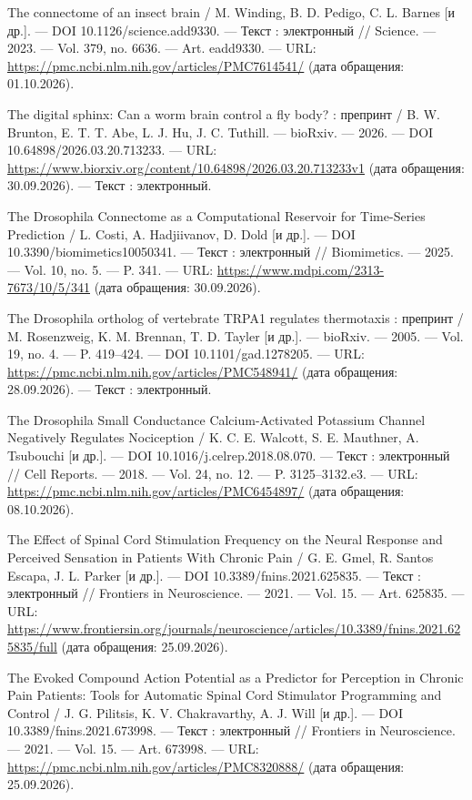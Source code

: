 \begin{list}{}{\setlength{\leftmargin}{10mm}\setlength{\labelwidth}{8mm}\setlength{\labelsep}{2mm}\setlength{\itemsep}{0pt}\setlength{\parsep}{0pt}\setlength{\topsep}{0pt}}
\item[268.] The connectome of an insect brain / M. Winding, B. D. Pedigo, C. L. Barnes [и др.]. — DOI 10.1126/science.add9330. — Текст : электронный // Science. — 2023. — Vol. 379, no. 6636. — Art. eadd9330. — URL: \url{https://pmc.ncbi.nlm.nih.gov/articles/PMC7614541/} (дата обращения: 01.10.2026).
\item[269.] The digital sphinx: Can a worm brain control a fly body? : препринт / B. W. Brunton, E. T. T. Abe, L. J. Hu, J. C. Tuthill. — bioRxiv. — 2026. — DOI 10.64898/2026.03.20.713233. — URL: \url{https://www.biorxiv.org/content/10.64898/2026.03.20.713233v1} (дата обращения: 30.09.2026). — Текст : электронный.
\item[270.] The Drosophila Connectome as a Computational Reservoir for Time-Series Prediction / L. Costi, A. Hadjiivanov, D. Dold [и др.]. — DOI 10.3390/biomimetics10050341. — Текст : электронный // Biomimetics. — 2025. — Vol. 10, no. 5. — P. 341. — URL: \url{https://www.mdpi.com/2313-7673/10/5/341} (дата обращения: 30.09.2026).
\item[271.] The Drosophila ortholog of vertebrate TRPA1 regulates thermotaxis : препринт / M. Rosenzweig, K. M. Brennan, T. D. Tayler [и др.]. — bioRxiv. — 2005. — Vol. 19, no. 4. — P. 419–424. — DOI 10.1101/gad.1278205. — URL: \url{https://pmc.ncbi.nlm.nih.gov/articles/PMC548941/} (дата обращения: 28.09.2026). — Текст : электронный.
\item[272.] The Drosophila Small Conductance Calcium-Activated Potassium Channel Negatively Regulates Nociception / K. C. E. Walcott, S. E. Mauthner, A. Tsubouchi [и др.]. — DOI 10.1016/j.celrep.2018.08.070. — Текст : электронный // Cell Reports. — 2018. — Vol. 24, no. 12. — P. 3125–3132.e3. — URL: \url{https://pmc.ncbi.nlm.nih.gov/articles/PMC6454897/} (дата обращения: 08.10.2026).
\item[273.] The Effect of Spinal Cord Stimulation Frequency on the Neural Response and Perceived Sensation in Patients With Chronic Pain / G. E. Gmel, R. Santos Escapa, J. L. Parker [и др.]. — DOI 10.3389/fnins.2021.625835. — Текст : электронный // Frontiers in Neuroscience. — 2021. — Vol. 15. — Art. 625835. — URL: \url{https://www.frontiersin.org/journals/neuroscience/articles/10.3389/fnins.2021.625835/full} (дата обращения: 25.09.2026).
\item[274.] The Evoked Compound Action Potential as a Predictor for Perception in Chronic Pain Patients: Tools for Automatic Spinal Cord Stimulator Programming and Control / J. G. Pilitsis, K. V. Chakravarthy, A. J. Will [и др.]. — DOI 10.3389/fnins.2021.673998. — Текст : электронный // Frontiers in Neuroscience. — 2021. — Vol. 15. — Art. 673998. — URL: \url{https://pmc.ncbi.nlm.nih.gov/articles/PMC8320888/} (дата обращения: 25.09.2026).

\end{list}

